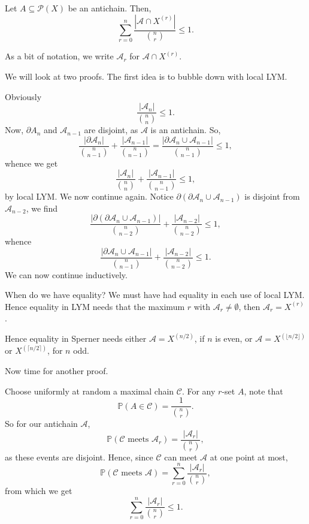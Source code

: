 \documentclass[12pt]{article}
\begin{document}
\begin{theorem}
	Let $A \subseteq \mathcal{P}(X)$ be an antichain. Then,
	\[
	\sum_{r = 0}^n \frac{|\mathcal{A} \cap X^{(r)}|}{\binom nr} \leq 1.
	\]
\end{theorem}

As a bit of notation, we write $\mathcal{A}_r$ for $\mathcal{A} \cap X^{(r)}$.

We will look at two proofs. The first idea is to bubble down with local LYM.

\begin{proofbox}
	Obviously
	\[
	\frac{|\mathcal{A}_n|}{\binom nn} \leq 1.
	\]
	Now, $\partial A_n$ and $\mathcal{A}_{n-1}$ are disjoint, as $\mathcal{A}$ is an antichain. So,
	\[
		\frac{|\partial \mathcal{A}_n|}{\binom n{n-1}} + \frac{|\mathcal{A}_{n-1}|}{\binom n{n-1}} = \frac{|\partial \mathcal{A}_n \cup \mathcal{A}_{n-1}|}{\binom n{n-1}} \leq 1,
	\]
	whence we get
	\[
		\frac{|\mathcal{A}_n|}{\binom nn} + \frac{|\mathcal{A}_{n-1}|}{\binom n{n-1}} \leq 1,
	\]
	by local LYM. We now continue again. Notice $\partial (\partial \mathcal{A}_n \cup \mathcal{A}_{n-1})$ is disjoint from $\mathcal{A}_{n-2}$, we find
	\[
		\frac{|\partial(\partial \mathcal{A}_n \cup \mathcal{A}_{n-1})|}{\binom n{n-2}} + \frac{|\mathcal{A}_{n-2}|}{\binom n{n-2}} \leq 1,
	\]
	whence
	\[
		\frac{|\partial \mathcal{A}_n \cup \mathcal{A}_{n-1}|}{\binom n{n-1}} + \frac{|\mathcal{A}_{n-2}|}{\binom n{n-2}} \leq 1.
	\]
	We can now continue inductively.
\end{proofbox}

When do we have equality? We must have had equality in each use of local LYM. Hence equality in LYM needs that the maximum $r$ with $\mathcal{A}_r \neq \emptyset$, then $\mathcal{A}_r = X^{(r)}$.

Hence equality in Sperner needs either $\mathcal{A} = X^{(n/2)}$, if $n$ is even, or $\mathcal{A} = X^{(\lfloor n/2 \rfloor)}$ or $X^{(\lceil n/2 \rceil)}$, for $n$ odd.


Now time for another proof.

\begin{proofbox}
	Choose uniformly at random a maximal chain $\mathcal{C}$. For any $r$-set $A$, note that
	\[
	\mathbb{P}(A \in \mathcal{C}) = \frac{1}{\binom nr}.
	\]
	So for our antichain $\mathcal{A}$,
	\[
		\mathbb{P}(\mathcal{C} \text{ meets } \mathcal{A}_r) = \frac{|\mathcal{A}_r|}{\binom nr},
	\]
	as these events are disjoint. Hence, since $\mathcal{C}$ can meet $\mathcal{A}$ at one point at most,
	\[
		\mathbb{P}(\mathcal{C} \text{ meets } \mathcal{A}) = \sum_{r = 0}^n \frac{|\mathcal{A}_r|}{\binom nr},
	\]
	from which we get
	\[
	\sum_{r = 0}^n \frac{|\mathcal{A}_r|}{\binom nr} \leq 1.
	\]
\end{proofbox}
\end{document}

